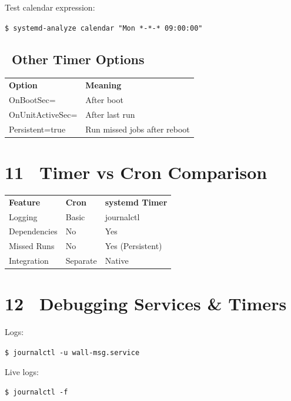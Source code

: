 \documentclass[12pt]{article}
\begin{document}
Test calendar expression:

\begin{highlightbox}
\texttt{\$ systemd-analyze calendar "Mon *-*-* 09:00:00"}
\end{highlightbox}

\subsection*{\faSlidersH\ Other Timer Options}

\begin{infobox}
\begin{tabular}{ll}
\textbf{Option} & \textbf{Meaning} \\
OnBootSec= & After boot \\
OnUnitActiveSec= & After last run \\
Persistent=true & Run missed jobs after reboot \\
\end{tabular}
\end{infobox}

\section*{11 \faBalanceScale\ Timer vs Cron Comparison}

\begin{infobox}
\begin{tabular}{lll}
\textbf{Feature} & \textbf{Cron} & \textbf{systemd Timer} \\
Logging & Basic & journalctl \\
Dependencies & No & Yes \\
Missed Runs & No & Yes (Persistent) \\
Integration & Separate & Native \\
\end{tabular}
\end{infobox}

\section*{12 \faBug\ Debugging Services \& Timers}

Logs:

\begin{highlightbox}
\texttt{\$ journalctl -u wall-msg.service}
\end{highlightbox}

Live logs:

\begin{highlightbox}
\texttt{\$ journalctl -f}
\end{highlightbox}
\end{document}
